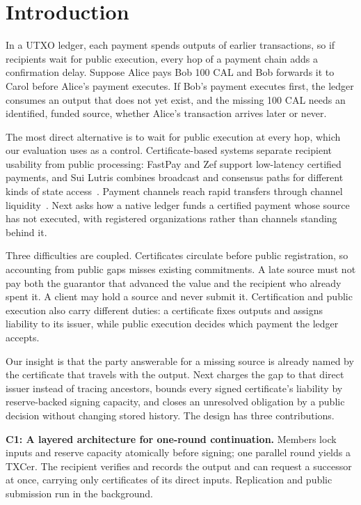 \section{Introduction}
\label{sec:introduction}

In a UTXO ledger, each payment spends outputs of earlier transactions, so if recipients wait for public execution, every hop of a payment chain adds a confirmation delay. Suppose Alice pays Bob 100 CAL and Bob forwards it to Carol before Alice's payment executes. If Bob's payment executes first, the ledger consumes an output that does not yet exist, and the missing 100 CAL needs an identified, funded source, whether Alice's transaction arrives later or never.

The most direct alternative is to wait for public execution at every hop, which our evaluation uses as a control. Certificate-based systems separate recipient usability from public processing: FastPay and Zef support low-latency certified payments, and Sui Lutris combines broadcast and consensus paths for different kinds of state access~\cite{fastpay,zef,lutris}. Payment channels reach rapid transfers through channel liquidity~\cite{blitz,donner}. Next asks how a native ledger funds a certified payment whose source has not executed, with registered organizations rather than channels standing behind it.

Three difficulties are coupled. Certificates circulate before public registration, so accounting from public gaps misses existing commitments. A late source must not pay both the guarantor that advanced the value and the recipient who already spent it. A client may hold a source and never submit it. Certification and public execution also carry different duties: a certificate fixes outputs and assigns liability to its issuer, while public execution decides which payment the ledger accepts.

Our insight is that the party answerable for a missing source is already named by the certificate that travels with the output. Next charges the gap to that direct issuer instead of tracing ancestors, bounds every signed certificate's liability by reserve-backed signing capacity, and closes an unresolved obligation by a public decision without changing stored history. The design has three contributions.

\noindent\textbf{C1: A layered architecture for one-round continuation.} Members lock inputs and reserve capacity atomically before signing; one parallel round yields a TXCer. The recipient verifies and records the output and can request a successor at once, carrying only certificates of its direct inputs. Replication and public submission run in the background.

